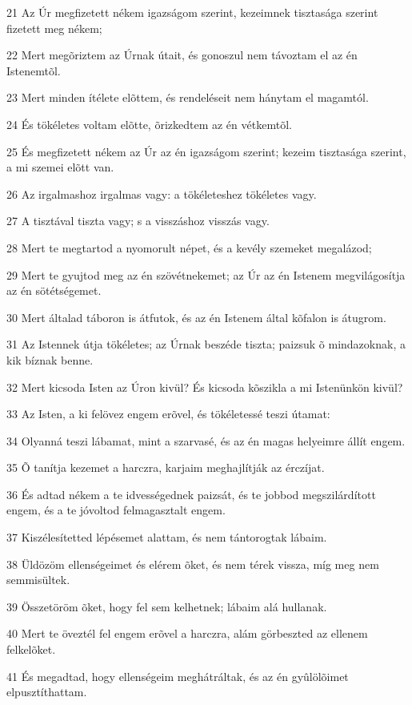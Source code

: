 \par 21 Az Úr megfizetett nékem igazságom szerint, kezeimnek tisztasága szerint fizetett meg nékem;
\par 22 Mert megõriztem az Úrnak útait, és gonoszul nem távoztam el az én Istenemtõl.
\par 23 Mert minden ítélete elõttem, és rendeléseit nem hánytam el magamtól.
\par 24 És tökéletes voltam elõtte, õrizkedtem az én vétkemtõl.
\par 25 És megfizetett nékem az Úr az én igazságom szerint; kezeim tisztasága szerint, a mi szemei elõtt van.
\par 26 Az irgalmashoz irgalmas vagy: a tökéleteshez tökéletes vagy.
\par 27 A tisztával tiszta vagy; s a visszáshoz visszás vagy.
\par 28 Mert te megtartod a nyomorult népet, és a kevély szemeket megalázod;
\par 29 Mert te gyujtod meg az én szövétnekemet; az Úr az én Istenem megvilágosítja az én sötétségemet.
\par 30 Mert általad táboron is átfutok, és az én Istenem által kõfalon is átugrom.
\par 31 Az Istennek útja tökéletes; az Úrnak beszéde tiszta; paizsuk õ mindazoknak, a kik bíznak benne.
\par 32 Mert kicsoda Isten az Úron kivül? És kicsoda kõszikla a mi Istenünkön kivül?
\par 33 Az Isten, a ki felövez engem erõvel, és tökéletessé teszi útamat:
\par 34 Olyanná teszi lábamat, mint a szarvasé, és az én magas helyeimre állít engem.
\par 35 Õ tanítja kezemet a harczra, karjaim meghajlítják az érczíjat.
\par 36 És adtad nékem a te idvességednek paizsát, és te jobbod megszilárdított engem, és a te jóvoltod felmagasztalt engem.
\par 37 Kiszélesítetted lépésemet alattam, és nem tántorogtak lábaim.
\par 38 Üldözöm ellenségeimet és elérem õket, és nem térek vissza, míg meg nem semmisültek.
\par 39 Összetöröm õket, hogy fel sem kelhetnek; lábaim alá hullanak.
\par 40 Mert te öveztél fel engem erõvel a harczra, alám görbeszted az ellenem felkelõket.
\par 41 És megadtad, hogy ellenségeim meghátráltak, és az én gyûlölõimet elpusztíthattam.
